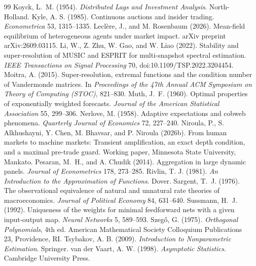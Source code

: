 \documentclass[12pt]{article}
\theoremstyle{definition}
\theoremstyle{remark}
\begin{document}
\begin{thebibliography}{99}
 Koyck, L.~M. (1954). \emph{Distributed Lags and Investment Analysis}. North-Holland.
 Kyle, A. S. (1985). Continuous auctions and insider trading. \emph{Econometrica} 53, 1315--1335.
 Lecl\`ere, J., and M. Rosenbaum (2026). Mean-field equilibrium of heterogeneous agents under market impact. arXiv preprint arXiv:2609.03115.
 Li, W., Z. Zhu, W. Gao, and W. Liao (2022). Stability and super-resolution of MUSIC and ESPRIT for multi-snapshot spectral estimation. \emph{IEEE Transactions on Signal Processing} 70, doi:10.1109/TSP.2022.3204454.
 Moitra, A. (2015). Super-resolution, extremal functions and the condition number of Vandermonde matrices. In \emph{Proceedings of the 47th Annual ACM Symposium on Theory of Computing (STOC)}, 821--830.
 Muth, J.~F. (1960). Optimal properties of exponentially weighted forecasts. \emph{Journal of the American Statistical Association} 55, 299--306.
 Nerlove, M. (1958). Adaptive expectations and cobweb phenomena. \emph{Quarterly Journal of Economics} 72, 227--240.
 Niroula, P., S. Alkhushayni, Y. Chen, M. Bhavsar, and P. Niroula (2026b). From human markets to machine markets: Transient amplification, an exact depth condition, and a maximal pre-trade guard. Working paper, Minnesota State University, Mankato.
 Pesaran, M.~H., and A. Chudik (2014). Aggregation in large dynamic panels. \emph{Journal of Econometrics} 178, 273--285.
 Rivlin, T. J. (1981). \emph{An Introduction to the Approximation of Functions}. Dover.
 Sargent, T.~J. (1976). The observational equivalence of natural and unnatural rate theories of macroeconomics. \emph{Journal of Political Economy} 84, 631--640.
 Sussmann, H.~J. (1992). Uniqueness of the weights for minimal feedforward nets with a given input-output map. \emph{Neural Networks} 5, 589--593.
 Szeg\H{o}, G. (1975). \emph{Orthogonal Polynomials}, 4th ed. American Mathematical Society Colloquium Publications 23, Providence, RI.
 Tsybakov, A. B. (2009). \emph{Introduction to Nonparametric Estimation}. Springer.
 van der Vaart, A. W. (1998). \emph{Asymptotic Statistics}. Cambridge University Press.

\end{thebibliography}
\end{document}
